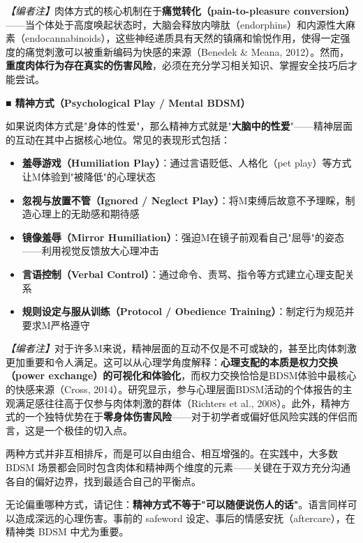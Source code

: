 \documentclass[12pt,UTF8]{ctexbook}
\begin{document}
\textit{【编者注】}肉体方式的核心机制在于\textbf{痛觉转化（pain-to-pleasure conversion）}——当个体处于高度唤起状态时，大脑会释放内啡肽（endorphins）和内源性大麻素（endocannabinoids），这些神经递质具有天然的镇痛和愉悦作用，使得一定强度的痛觉刺激可以被重新编码为快感的来源（Benedek \& Meana, 2012）。然而，\textbf{重度肉体行为存在真实的伤害风险}，必须在充分学习相关知识、掌握安全技巧后才能尝试。

\noindent\textbf{■ 精神方式（Psychological Play / Mental BDSM）}

如果说肉体方式是"身体的性爱"，那么精神方式就是"\textbf{大脑中的性爱}"——精神层面的互动在其中占据核心地位。常见的表现形式包括：

\begin{itemize}
	\item \textbf{羞辱游戏（Humiliation Play）}：通过言语贬低、人格化（pet play）等方式让M体验到"被降低"的心理状态
	\item \textbf{忽视与放置不管（Ignored / Neglect Play）}：将M束缚后故意不予理睬，制造心理上的无助感和期待感
	\item \textbf{镜像羞辱（Mirror Humiliation）}：强迫M在镜子前观看自己"屈辱"的姿态——利用视觉反馈放大心理冲击
	\item \textbf{言语控制（Verbal Control）}：通过命令、责骂、指令等方式建立心理支配关系
	\item \textbf{规则设定与服从训练（Protocol / Obedience Training）}：制定行为规范并要求M严格遵守
\end{itemize}

\textit{【编者注】}对于许多M来说，精神层面的互动不仅是不可或缺的，甚至比肉体刺激更加重要和令人满足。这可以从心理学角度解释：\textbf{心理支配的本质是权力交换（power exchange）的可视化和体验化}，而权力交换恰恰是BDSM体验中最核心的快感来源（Cross, 2014）。研究显示，参与心理层面BDSM活动的个体报告的主观满足感往往高于仅参与肉体刺激的群体（Richters et al., 2008）。此外，精神方式的一个独特优势在于\textbf{零身体伤害风险}——对于初学者或偏好低风险实践的伴侣而言，这是一个极佳的切入点。

\noindent 两种方式并非互相排斥，而是可以自由组合、相互增强的。在实践中，大多数 BDSM 场景都会同时包含肉体和精神两个维度的元素——关键在于双方充分沟通各自的偏好边界，找到最适合自己的平衡点。

\begin{tcolorbox}[colback=pink!5!white,colframe=red!50!black,title=贴心小叮咛]
无论偏重哪种方式，请记住：\textbf{精神方式不等于"可以随便说伤人的话"}。语言同样可以造成深远的心理伤害。事前的 safeword 设定、事后的情感安抚（aftercare），在精神类 BDSM 中尤为重要。
\end{tcolorbox}
\end{document}
